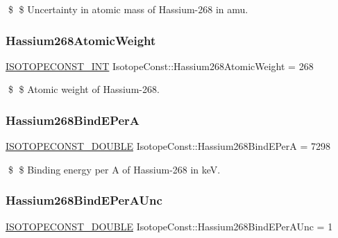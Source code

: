 \$ \$ Uncertainty in atomic mass of Hassium-\/268 in amu. \mbox{\label{group___isotope_const-_hassium-_hs268_ga92d691d2b9ba5515675681b3efcec319}} 
\subsubsection{\texorpdfstring{Hassium268\+Atomic\+Weight}{Hassium268AtomicWeight}}
{\footnotesize\ttfamily \mbox{\hyperlink{group___isotope_const-_macros_ga5f18360b3e99483a35c32d789e62621c}{I\+S\+O\+T\+O\+P\+E\+C\+O\+N\+S\+T\+\_\+\+I\+NT}} Isotope\+Const\+::\+Hassium268\+Atomic\+Weight = 268}

\$ \$ Atomic weight of Hassium-\/268. \mbox{\label{group___isotope_const-_hassium-_hs268_ga7fb6ce53ec7021db869be43025a2e160}} 
\subsubsection{\texorpdfstring{Hassium268\+Bind\+E\+PerA}{Hassium268BindEPerA}}
{\footnotesize\ttfamily \mbox{\hyperlink{group___isotope_const-_macros_ga8f45a7272ce02c0b4c65c44636ed719a}{I\+S\+O\+T\+O\+P\+E\+C\+O\+N\+S\+T\+\_\+\+D\+O\+U\+B\+LE}} Isotope\+Const\+::\+Hassium268\+Bind\+E\+PerA = 7298}

\$ \$ Binding energy per A of Hassium-\/268 in keV. \mbox{\label{group___isotope_const-_hassium-_hs268_ga4740af3dadcbda0c1383bb5ce42073e1}} 
\subsubsection{\texorpdfstring{Hassium268\+Bind\+E\+Per\+A\+Unc}{Hassium268BindEPerAUnc}}
{\footnotesize\ttfamily \mbox{\hyperlink{group___isotope_const-_macros_ga8f45a7272ce02c0b4c65c44636ed719a}{I\+S\+O\+T\+O\+P\+E\+C\+O\+N\+S\+T\+\_\+\+D\+O\+U\+B\+LE}} Isotope\+Const\+::\+Hassium268\+Bind\+E\+Per\+A\+Unc = 1}


